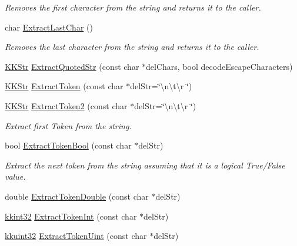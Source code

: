 \begin{DoxyCompactItemize}
\begin{DoxyCompactList}\small\item\em Removes the first character from the string and returns it to the caller. \end{DoxyCompactList}\item 
char \hyperlink{class_k_k_b_1_1_k_k_str_a04d9dc84df0ebbae0486d0cfe7a86698}{Extract\+Last\+Char} ()
\begin{DoxyCompactList}\small\item\em Removes the last character from the string and returns it to the caller. \end{DoxyCompactList}\item 
\hyperlink{class_k_k_b_1_1_k_k_str}{K\+K\+Str} \hyperlink{class_k_k_b_1_1_k_k_str_a90b08420d7941d737e1f9c68dfb647a1}{Extract\+Quoted\+Str} (const char $\ast$del\+Chars, bool decode\+Escape\+Characters)
\item 
\hyperlink{class_k_k_b_1_1_k_k_str}{K\+K\+Str} \hyperlink{class_k_k_b_1_1_k_k_str_acc31c95308d6d699debde883c11e5802}{Extract\+Token} (const char $\ast$del\+Str=\char`\"{}\textbackslash{}n\textbackslash{}t\textbackslash{}r \char`\"{})
\item 
\hyperlink{class_k_k_b_1_1_k_k_str}{K\+K\+Str} \hyperlink{class_k_k_b_1_1_k_k_str_afe41140cee0520f0be8a3022938a1b03}{Extract\+Token2} (const char $\ast$del\+Str=\char`\"{}\textbackslash{}n\textbackslash{}t\textbackslash{}r \char`\"{})
\begin{DoxyCompactList}\small\item\em Extract first Token from the string. \end{DoxyCompactList}\item 
bool \hyperlink{class_k_k_b_1_1_k_k_str_a60077db4bc35f3a058dd813b34b1b312}{Extract\+Token\+Bool} (const char $\ast$del\+Str)
\begin{DoxyCompactList}\small\item\em Extract the next token from the string assuming that it is a logical True/\+False value. \end{DoxyCompactList}\item 
double \hyperlink{class_k_k_b_1_1_k_k_str_a975d1cea910c2eb3ee08a4db1f3009d4}{Extract\+Token\+Double} (const char $\ast$del\+Str)
\item 
\hyperlink{namespace_k_k_b_a8fa4952cc84fda1de4bec1fbdd8d5b1b}{kkint32} \hyperlink{class_k_k_b_1_1_k_k_str_ae50047144b908273ffd004bd9379f6d0}{Extract\+Token\+Int} (const char $\ast$del\+Str)
\item 
\hyperlink{namespace_k_k_b_af8d832f05c54994a1cce25bd5743e19a}{kkuint32} \hyperlink{class_k_k_b_1_1_k_k_str_a7f1ec5a57738b6e5123f24492ac0a1b1}{Extract\+Token\+Uint} (const char $\ast$del\+Str)

\end{DoxyCompactItemize}
